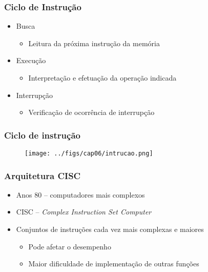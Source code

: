 \documentclass[aspectratio=169,
				xcolor=table]{beamer}
\begin{document}
	
	\begin{frame}
		\frametitle{Ciclo de Instrução}
		\begin{itemize}
			\item Busca
			\begin{itemize}
				\item Leitura da próxima instrução da memória
			\end{itemize}
			\vspace{1em}
			\item Execução
			\begin{itemize}
				\item Interpretação e efetuação da operação indicada
			\end{itemize}
			\vspace{1em}
			\item Interrupção
			\begin{itemize}
				\item Verificação de ocorrência de interrupção
			\end{itemize}
		\end{itemize}
	\end{frame}
	
	\begin{frame}
		\frametitle{Ciclo de instrução}
		\begin{figure}
			\texttt{[image: ../figs/cap06/intrucao.png]} 
		\end{figure}
	\end{frame}
	
	\begin{frame}
		\frametitle{Arquitetura CISC}
		\begin{itemize}
			\item Anos 80 – computadores mais complexos
			\vspace{1em}

			\item CISC – \textit{Complex Instruction Set Computer}
			\vspace{1em}

			\item Conjuntos de instruções cada vez mais complexas e maiores
			\begin{itemize}
				\item Pode afetar o desempenho
				\item Maior dificuldade de implementação de outras funções

			\end{itemize}

		\end{itemize}
	\end{frame}
	
\end{document}
